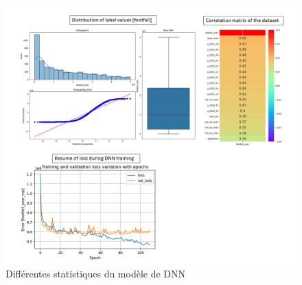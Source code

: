\documentclass{themeensg}
\begin{document}
\begin{appendices}
\begin{figure}[H]
  \centering
  \includegraphics[width=\linewidth]{images/graphs/stats_footfall.png}
  \caption{Différentes statistiques du modèle de DNN}
\end{figure}

\end{appendices} 
\end{document}
